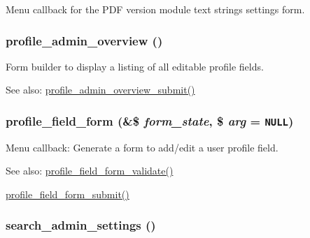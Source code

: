 Menu callback for the PDF version module text strings settings form. \hypertarget{group__forms_gf5de7da6a31a83a313aa279ec696e82c}{
\subsubsection[{profile\_\-admin\_\-overview}]{\setlength{\rightskip}{0pt plus 5cm}profile\_\-admin\_\-overview ()}}
\label{group__forms_gf5de7da6a31a83a313aa279ec696e82c}


Form builder to display a listing of all editable profile fields.

\begin{Desc}
\item[See also:]\hyperlink{profile_8admin_8inc_010af3295f669ceac61a1da0f8d5ad53}{profile\_\-admin\_\-overview\_\-submit()} \end{Desc}
\hypertarget{group__forms_g48b4a6628f7c40544ce7656a61eb6f69}{
\subsubsection[{profile\_\-field\_\-form}]{\setlength{\rightskip}{0pt plus 5cm}profile\_\-field\_\-form (\&\$ {\em form\_\-state}, \/  \$ {\em arg} = {\tt NULL})}}
\label{group__forms_g48b4a6628f7c40544ce7656a61eb6f69}


Menu callback: Generate a form to add/edit a user profile field.

\begin{Desc}
\item[See also:]\hyperlink{profile_8admin_8inc_68cc1dfe2c4f0e0946ede9786b4554e2}{profile\_\-field\_\-form\_\-validate()} 

\hyperlink{profile_8admin_8inc_25efcaa4c4b8e9dc9568622ad0ab3411}{profile\_\-field\_\-form\_\-submit()} \end{Desc}
\hypertarget{group__forms_g9441f1f43f030e4a7fd39a7470e22f5f}{
\subsubsection[{search\_\-admin\_\-settings}]{\setlength{\rightskip}{0pt plus 5cm}search\_\-admin\_\-settings ()}}
\label{group__forms_g9441f1f43f030e4a7fd39a7470e22f5f}


